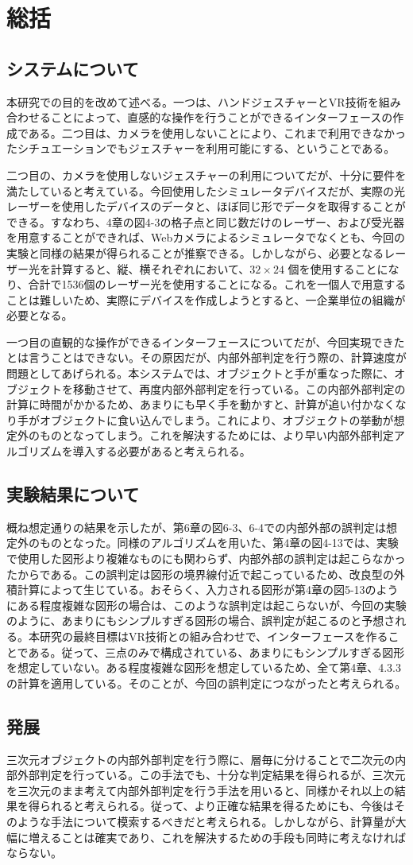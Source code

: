 \section{総括}

\subsection{システムについて}
本研究での目的を改めて述べる。一つは、ハンドジェスチャーとVR技術を組み合わせることによって、直感的な操作を行うことができるインターフェースの作成である。二つ目は、カメラを使用しないことにより、これまで利用できなかったシチュエーションでもジェスチャーを利用可能にする、ということである。

二つ目の、カメラを使用しないジェスチャーの利用についてだが、十分に要件を満たしていると考えている。今回使用したシミュレータデバイスだが、実際の光レーザーを使用したデバイスのデータと、ほぼ同じ形でデータを取得することができる。すなわち、4章の図4-3の格子点と同じ数だけのレーザー、および受光器を用意することができれば、Webカメラによるシミュレータでなくとも、今回の実験と同様の結果が得られることが推察できる。しかしながら、必要となるレーザー光を計算すると、縦、横それぞれにおいて、$32 \times 24$ 個を使用することになり、合計で1536個のレーザー光を使用することになる。これを一個人で用意することは難しいため、実際にデバイスを作成しようとすると、一企業単位の組織が必要となる。

一つ目の直観的な操作ができるインターフェースについてだが、今回実現できたとは言うことはできない。その原因だが、内部外部判定を行う際の、計算速度が問題としてあげられる。本システムでは、オブジェクトと手が重なった際に、オブジェクトを移動させて、再度内部外部判定を行っている。この内部外部判定の計算に時間がかかるため、あまりにも早く手を動かすと、計算が追い付かなくなり手がオブジェクトに食い込んでしまう。これにより、オブジェクトの挙動が想定外のものとなってしまう。これを解決するためには、より早い内部外部判定アルゴリズムを導入する必要があると考えられる。

\subsection{実験結果について}
概ね想定通りの結果を示したが、第6章の図6-3、6-4での内部外部の誤判定は想定外のものとなった。同様のアルゴリズムを用いた、第4章の図4-13では、実験で使用した図形より複雑なものにも関わらず、内部外部の誤判定は起こらなかったからである。この誤判定は図形の境界線付近で起こっているため、改良型の外積計算によって生じている。おそらく、入力される図形が第4章の図5-13のようにある程度複雑な図形の場合は、このような誤判定は起こらないが、今回の実験のように、あまりにもシンプルすぎる図形の場合、誤判定が起こるのと予想される。本研究の最終目標はVR技術との組み合わせで、インターフェースを作ることである。従って、三点のみで構成されている、あまりにもシンプルすぎる図形を想定していない。ある程度複雑な図形を想定しているため、全て第4章、4.3.3 の計算を適用している。そのことが、今回の誤判定につながったと考えられる。


\subsection{発展}
三次元オブジェクトの内部外部判定を行う際に、層毎に分けることで二次元の内部外部判定を行っている。この手法でも、十分な判定結果を得られるが、三次元を三次元のまま考えて内部外部判定を行う手法を用いると、同様かそれ以上の結果を得られると考えられる。従って、より正確な結果を得るためにも、今後はそのような手法について模索するべきだと考えられる。しかしながら、計算量が大幅に増えることは確実であり、これを解決するための手段も同時に考えなければならない。

